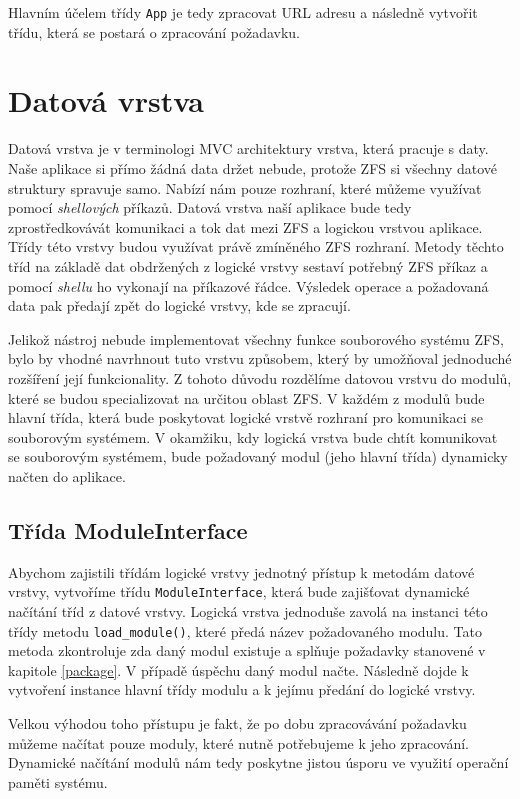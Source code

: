     Hlavním účelem třídy \verb|App| je tedy zpracovat URL adresu a následně vytvořit třídu, která se postará o zpracování požadavku.

\section{Datová vrstva}
Datová vrstva je v terminologi MVC architektury vrstva, která pracuje s daty. Naše aplikace si přímo žádná data držet nebude, protože ZFS si všechny datové struktury spravuje samo. Nabízí nám pouze rozhraní, které můžeme využívat pomocí \emph{shellových} příkazů. Datová vrstva naší aplikace bude tedy zprostředkovávát komunikaci a tok dat mezi ZFS a logickou vrstvou aplikace. Třídy této vrstvy budou využívat právě zmíněného ZFS rozhraní. Metody těchto tříd na základě dat obdržených z logické vrstvy sestaví potřebný ZFS příkaz a pomocí \emph{shellu} ho vykonají na příkazové řádce. Výsledek operace a požadovaná data pak předají zpět do logické vrstvy, kde se zpracují.

Jelikož nástroj nebude implementovat všechny funkce souborového systému ZFS, bylo by vhodné navrhnout tuto vrstvu způsobem, který by umožňoval jednoduché rozšíření její funkcionality.
Z tohoto důvodu rozdělíme datovou vrstvu do modulů, které se budou specializovat na určitou oblast ZFS. V každém z modulů bude hlavní třída, která bude poskytovat logické vrstvě rozhraní pro komunikaci se souborovým systémem. V okamžiku, kdy logická vrstva bude chtít komunikovat se souborovým systémem, bude požadovaný modul (jeho hlavní třída) dynamicky načten do aplikace.
    \subsection{Třída ModuleInterface}
    Abychom zajistili třídám logické vrstvy jednotný přístup k metodám datové vrstvy, vytvoříme třídu \verb|ModuleInterface|, která bude zajišťovat dynamické načítání tříd z datové vrstvy. Logická vrstva jednoduše zavolá na instanci této třídy metodu \verb|load_module()|, které předá název požadovaného modulu. Tato metoda zkontroluje zda daný modul existuje a splňuje požadavky stanovené v kapitole \ref{package}. V případě úspěchu daný modul načte. Následně dojde k vytvoření instance hlavní třídy modulu a k jejímu předání do logické vrstvy.

    Velkou výhodou toho přístupu je fakt, že po dobu zpracovávání požadavku můžeme načítat pouze moduly, které nutně potřebujeme k jeho zpracování. Dynamické načítání modulů nám tedy poskytne jistou úsporu ve využití operační paměti systému.
